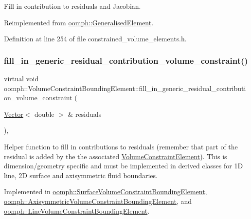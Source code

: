 Fill in contribution to residuals and Jacobian. 



Reimplemented from \hyperlink{classoomph_1_1GeneralisedElement_a310c97f515e8504a48179c0e72c550d7}{oomph\+::\+Generalised\+Element}.



Definition at line 254 of file constrained\+\_\+volume\+\_\+elements.\+h.

\mbox{\label{classoomph_1_1VolumeConstraintBoundingElement_a717f1085709bd8820b8043ff94ecb0c5}} 
\subsubsection{\texorpdfstring{fill\+\_\+in\+\_\+generic\+\_\+residual\+\_\+contribution\+\_\+volume\+\_\+constraint()}{fill\_in\_generic\_residual\_contribution\_volume\_constraint()}}
{\footnotesize\ttfamily virtual void oomph\+::\+Volume\+Constraint\+Bounding\+Element\+::fill\+\_\+in\+\_\+generic\+\_\+residual\+\_\+contribution\+\_\+volume\+\_\+constraint (\begin{DoxyParamCaption}\item[{\hyperlink{classoomph_1_1Vector}{Vector}$<$ double $>$ \&}]{residuals }\end{DoxyParamCaption})\hspace{0.3cm}{\ttfamily [protected]}, {}}



Helper function to fill in contributions to residuals (remember that part of the residual is added by the the associated \hyperlink{classoomph_1_1VolumeConstraintElement}{Volume\+Constraint\+Element}). This is dimension/geometry specific and must be implemented in derived classes for 1D line, 2D surface and axisymmetric fluid boundaries. 



Implemented in \hyperlink{classoomph_1_1SurfaceVolumeConstraintBoundingElement_a5813fa65063eb55a5b264539d77cac88}{oomph\+::\+Surface\+Volume\+Constraint\+Bounding\+Element}, \hyperlink{classoomph_1_1AxisymmetricVolumeConstraintBoundingElement_a2a3f3b86079f27d52679f357f5276d91}{oomph\+::\+Axisymmetric\+Volume\+Constraint\+Bounding\+Element}, and \hyperlink{classoomph_1_1LineVolumeConstraintBoundingElement_a03145a064e559d786f730c85000f9fb4}{oomph\+::\+Line\+Volume\+Constraint\+Bounding\+Element}.

